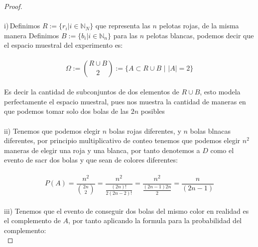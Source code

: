 \documentclass[11pt,letterpaper]{article}
\newcommand{\N}{\mathbb{N}}
\begin{document}
\begin{proof}\,\\
    \,\\
    i)\,Definimos $R:=\{r_i|i\in \N_N\}$ que representa las $n$ pelotas rojas, de la misma manera Definimos
    $B:=\{b_i|i\in \N_n\}$ para las $n$ pelotas blancas, podemos decir que el espacio muestral del experimento es:\,\\
    \,\\
    \begin{equation*}
        \Omega:=\binom{R\cup B}{2}:=\{A\subset R\cup B\,\,|\,\,|A|=2\} 
    \end{equation*}\,\\
    Es decir la cantidad de subconjuntos de dos elementos de $R\cup B$, esto modela perfectamente el espacio muestral, pues nos muestra
    la cantidad de maneras en que podemos tomar solo dos bolas de las $2n$ posibles\,\\
    \,\\
    ii)\,\,Tenemos que podemos elegir $n$ bolas rojas diferentes, y $n$ bolas blnacas diferentes, por principio multiplicativo de conteo tenemos que
    podemos elegir $n^2$ maneras de elegir una roja y una blanca, por tanto denotemos a $D$ como el evento de sacr dos bolas y que sean de colores diferentes:\,\\
    \,\\
    \begin{equation*}
        P(A)=\frac{n^2}{\binom{2n }{2}}=\frac{n^2}{\frac{(2n)!}{2(2n-2)!}}=\frac{n^2}{\frac{(2n-1)2n}{2}}=\frac{n}{(2n-1)}
    \end{equation*}\,\\
    iii)\,\,Tenemos que el evento de conseguir dos bolas del mismo color en realidad es el complemento de $A$, por tanto aplicando la formula para la probabilidad del complemento:\,\\

\end{proof}
\end{document}
